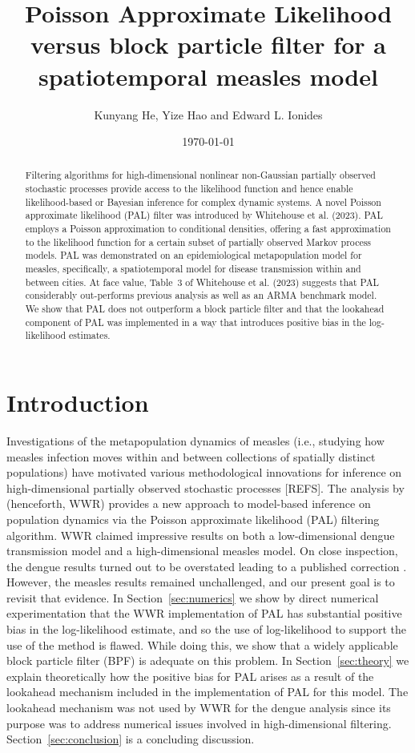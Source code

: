 \documentclass{article}
\title{Poisson Approximate Likelihood versus block particle filter for a spatiotemporal measles model}
\author{Kunyang He, Yize Hao and Edward L. Ionides}
\date{\today\\
\eic{DRAFT IN PROGRESS, LOOKING TO CLARIFY THE CALCULATIONS THAT WE NEED TO SECURE THE MAIN ARGUMENT}}
\begin{document}
\maketitle

\begin{abstract}
Filtering algorithms for high-dimensional nonlinear non-Gaussian partially observed stochastic processes provide access to the likelihood function and hence enable likelihood-based or Bayesian 
inference for complex dynamic systems.
A novel Poisson approximate likelihood (PAL) filter was introduced by Whitehouse et al. (2023). PAL employs a Poisson approximation to conditional densities, offering a fast approximation to the likelihood function for a certain subset of partially observed Markov process models.
PAL was demonstrated on an epidemiological metapopulation model for measles, specifically, a spatiotemporal model for disease transmission within and between cities. 
At face value, Table~3 of Whitehouse et al. (2023) suggests that PAL considerably out-performs previous analysis as well as an ARMA benchmark model.
We show that PAL does not outperform a block particle filter and that the lookahead component of PAL was implemented in a way that introduces positive bias in the log-likelihood estimates.

\end{abstract}

\section{Introduction}

Investigations of the metapopulation dynamics of measles (i.e., studying how measles infection moves within and between collections of spatially distinct populations) have motivated various methodological innovations for inference on high-dimensional partially observed stochastic processes [REFS].
The analysis by \citet{whitehouse23} (henceforth, WWR) provides a new approach to model-based inference on population dynamics via the Poisson approximate likelihood (PAL) filtering algorithm.
WWR claimed impressive results on both a low-dimensional dengue transmission model and a high-dimensional measles model. 
On close inspection, the dengue results turned out to be overstated \citep{hao24-arxiv} leading to a published correction \citep{whitehouse25-correction}.
However, the measles results remained unchallenged, and our present goal is to revisit that evidence.
In Section~\ref{sec:numerics} we show by direct numerical experimentation that the WWR implementation of PAL has substantial positive bias in the log-likelihood estimate, and so the use of log-likelihood to support the use of the method is flawed.
While doing this, we show that a widely applicable block particle filter (BPF) is adequate on this problem.
In Section~\ref{sec:theory} we explain theoretically how the positive bias for PAL arises as a result of the lookahead mechanism included in the implementation of PAL for this model.
The lookahead mechanism was not used by WWR for the dengue analysis since its purpose was to address numerical issues involved in high-dimensional filtering.
Section~\ref{sec:conclusion} is a concluding discussion.
\end{document}
